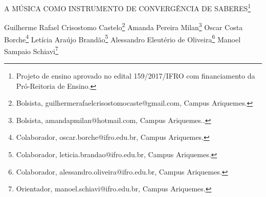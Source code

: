 \documentclass[article,12pt,onesidea,4paper,english,brazil]{abntex2}
\begin{document}
	
	
	\frenchspacing 
	
	\begin{center}
		\LARGE A MÚSICA COMO INSTRUMENTO DE CONVERGÊNCIA DE SABERES\footnote{Projeto de ensino aprovado no edital 159/2017/IFRO com financiamento da Pró-Reitoria de Ensino.}
		
		\normalsize
	Guilherme Rafael Crisostomo Castelo\footnote{Bolsista, guilhermerafaelcrisostomocaste@gmail.com, Campus Ariquemes.} 
		Amanda Pereira Milan\footnote{Bolsista, amandapmilan@hotmail.com, Campus Ariquemes..} 
	Oscar Costa Borche\footnote{Colaborador, oscar.borche@ifro.edu.br, Campus Ariquemes.} 
	Letícia Araújo Brandão\footnote{Colaborador, leticia.brandao@ifro.edu.br, Campus Ariquemes.} 
 Alessandro Eleutério de Oliveira\footnote{Colaborador, alessandro.oliveira@ifro.edu.br, Campus Ariquemes.} 
Manoel Sampaio Schiavi\footnote{Orientador, manoel.schiavi@ifro.edu.br, Campus Ariquemes.} 
	\end{center}
	
\end{document}
